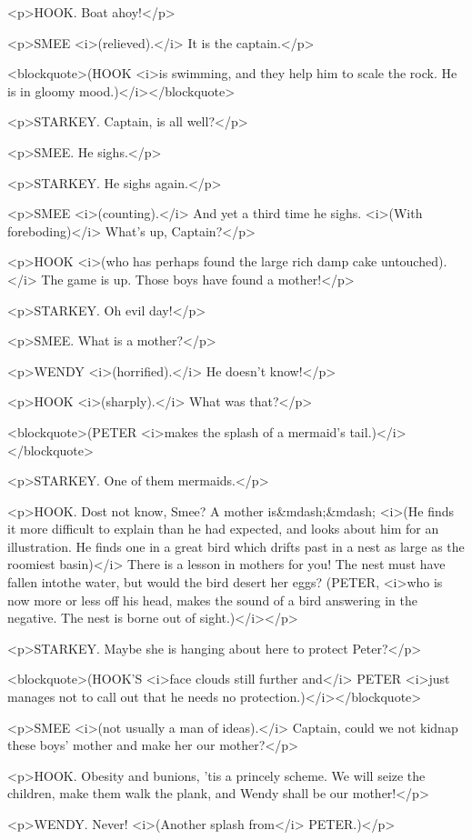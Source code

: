 <p>HOOK. Boat ahoy!</p>

<p>SMEE <i>(relieved).</i> It is the captain.</p>

<blockquote>(HOOK <i>is swimming, and they help him to scale the
rock. He is in gloomy mood.)</i></blockquote>

<p>STARKEY. Captain, is all well?</p>

<p>SMEE. He sighs.</p>

<p>STARKEY. He sighs again.</p>

<p>SMEE <i>(counting).</i> And yet a third time he sighs. <i>(With
foreboding)</i> What's up, Captain?</p>

<p>HOOK <i>(who has perhaps found the large rich damp cake
untouched).</i> The game is up. Those boys have found a mother!</p>

<p>STARKEY. Oh evil day!</p>

<p>SMEE. What is a mother?</p>

<p>WENDY <i>(horrified).</i> He doesn't know!</p>

<p>HOOK <i>(sharply).</i> What was that?</p>

<blockquote>(PETER <i>makes the splash of a mermaid's
tail.)</i></blockquote>

<p>STARKEY. One of them mermaids.</p>

<p>HOOK. Dost not know, Smee? A mother is&mdash;&mdash; <i>(He finds
it more difficult to explain than he had expected, and looks about
him for an illustration. He finds one in a great bird which drifts
past in a nest as large as the roomiest basin)</i> There is a lesson
in mothers for you! The nest must have fallen intothe water, but
would the bird desert her eggs? (PETER, <i>who is now more or less
off his head, makes the sound of a bird answering in the negative.
The nest is borne out of sight.)</i></p>

<p>STARKEY. Maybe she is hanging about here to protect Peter?</p>

<blockquote>(HOOK'S <i>face clouds still further and</i> PETER
<i>just manages not to call out that he needs no
protection.)</i></blockquote>

<p>SMEE <i>(not usually a man of ideas).</i> Captain, could we not
kidnap these boys' mother and make her our mother?</p>

<p>HOOK. Obesity and bunions, 'tis a princely scheme. We will seize
the children, make them walk the plank, and Wendy shall be our
mother!</p>

<p>WENDY. Never! <i>(Another splash from</i> PETER.)</p>

